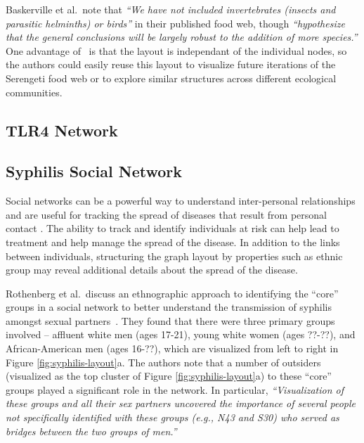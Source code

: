 Baskerville et al.\ note that \emph{``We have not included invertebrates
  (insects and parasitic helminths) or birds''} in their published food
web, though \emph{``hypothesize that the general conclusions will be
  largely robust to the addition of more species.''} One advantage of
\projectname~is that the layout is independant of the individual nodes, so
the authors could easily reuse this layout to visualize future iterations
of the Serengeti food web or to explore similar structures across different
ecological communities.

\subsection{TLR4 Network}


\subsection{Syphilis Social Network}
\syphilisLayout
\syphilisSpec


Social networks can be a powerful way to understand inter-personal
relationships and are useful for tracking the spread of diseases that
result from personal contact \cite{rothenberg1998using} . The ability to track and identify individuals at risk can
help lead to treatment and help manage the spread of the disease. In
addition to the links between individuals, structuring the graph layout by
properties such as ethnic group may reveal additional details about the
spread of the disease.

Rothenberg et al.\ discuss an ethnographic approach to identifying the
``core'' groups in a social network to better understand the transmission
of syphilis amongst sexual partners~\cite{rothenberg1998using}. They found
that there were three primary groups involved -- affluent white men (ages
17-21), young white women (ages ??-??), and African-American men (ages
16-??), which are visualized from left to right in Figure
\ref{fig:syphilis-layout}a. The authors note that a number of outsiders
(visualized as the top cluster of Figure \ref{fig:syphilis-layout}a) to
these ``core'' groups played a significant role in the network. In
particular, \emph{``Visualization of these groups and all their sex
  partners uncovered the importance of several people not specifically
  identified with these groups (e.g., N43 and S30) who served as bridges
  between the two groups of men.''}

